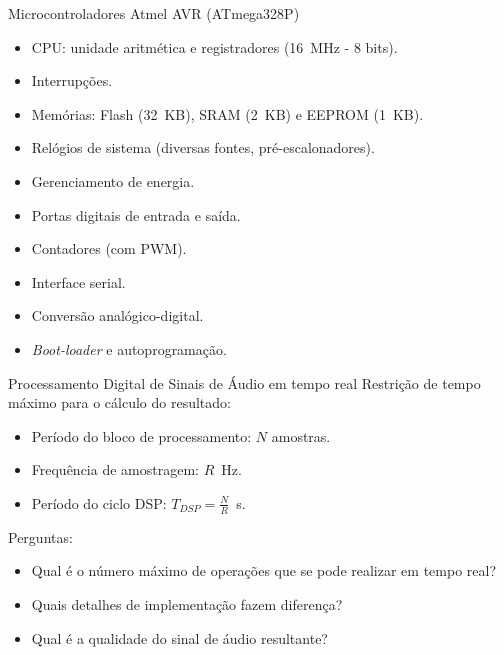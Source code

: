 \begin{frame}{Microcontroladores Atmel AVR (ATmega328P)}
\begin{itemize}
  \item CPU: unidade aritmética e registradores (16~MHz - 8 bits).
  \item Interrupções.
  \item Memórias: Flash (32~KB), SRAM (2~KB) e EEPROM (1~KB).
  \item Relógios de sistema (diversas fontes, pré-escalonadores).
  \item Gerenciamento de energia.
  \item Portas digitais de entrada e saída.
  \item Contadores (com PWM).
  \item Interface serial.
  \item Conversão analógico-digital.
  \item \emph{Boot-loader} e autoprogramação.
\end{itemize}
\end{frame}


\begin{frame}{Processamento Digital de Sinais de Áudio em tempo real}
Restrição de tempo máximo para o cálculo do resultado:
\begin{itemize}
    \item Período do bloco de processamento: $N$ amostras.
    \item Frequência de amostragem: $R$~Hz.
    \item Período do ciclo DSP: $T_{DSP}=\frac{N}{R}$~s.
\end{itemize}
\vspace{2em}
Perguntas:
\begin{itemize}
  \item Qual é o número máximo de operações que se pode realizar em tempo real?
  \item Quais detalhes de implementação fazem diferença?
  \item Qual é a qualidade do sinal de áudio resultante?
\end{itemize}
\end{frame}


